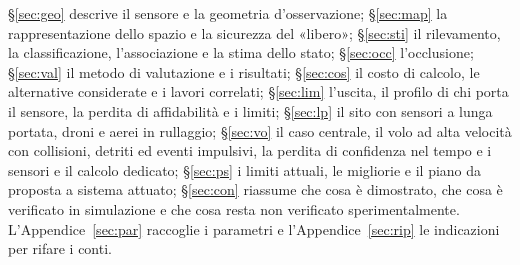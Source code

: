 \S\ref{sec:geo} descrive il sensore e la geometria d'osservazione; \S\ref{sec:map} la rappresentazione dello spazio e la sicurezza del «libero»; \S\ref{sec:sti} il rilevamento, la classificazione, l'associazione e la stima dello stato; \S\ref{sec:occ} l'occlusione; \S\ref{sec:val} il metodo di valutazione e i risultati; \S\ref{sec:cos} il costo di calcolo, le alternative considerate e i lavori correlati; \S\ref{sec:lim} l'uscita, il profilo di chi porta il sensore, la perdita di affidabilità e i limiti; \S\ref{sec:lp} il sito con sensori a lunga portata, droni e aerei in rullaggio; \S\ref{sec:vo} il caso centrale, il volo ad alta velocità con collisioni, detriti ed eventi impulsivi, la perdita di confidenza nel tempo e i sensori e il calcolo dedicato; \S\ref{sec:ps} i limiti attuali, le migliorie e il piano da proposta a sistema attuato; \S\ref{sec:con} riassume che cosa è dimostrato, che cosa è verificato in simulazione e che cosa resta non verificato sperimentalmente. L'Appendice~\ref{sec:par} raccoglie i parametri e l'Appendice~\ref{sec:rip} le indicazioni per rifare i conti.
